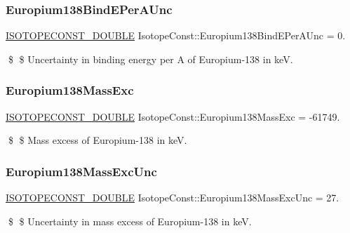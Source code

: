 \subsubsection{\texorpdfstring{Europium138\+Bind\+E\+Per\+A\+Unc}{Europium138BindEPerAUnc}}
{\footnotesize\ttfamily \mbox{\hyperlink{group___isotope_const-_macros_ga8f45a7272ce02c0b4c65c44636ed719a}{I\+S\+O\+T\+O\+P\+E\+C\+O\+N\+S\+T\+\_\+\+D\+O\+U\+B\+LE}} Isotope\+Const\+::\+Europium138\+Bind\+E\+Per\+A\+Unc = 0.}

\$ \$ Uncertainty in binding energy per A of Europium-\/138 in keV. \mbox{\label{group___isotope_const-_europium-_eu138_ga3e7e1759a38e0c6c7fadb81d2b35d40e}} 
\subsubsection{\texorpdfstring{Europium138\+Mass\+Exc}{Europium138MassExc}}
{\footnotesize\ttfamily \mbox{\hyperlink{group___isotope_const-_macros_ga8f45a7272ce02c0b4c65c44636ed719a}{I\+S\+O\+T\+O\+P\+E\+C\+O\+N\+S\+T\+\_\+\+D\+O\+U\+B\+LE}} Isotope\+Const\+::\+Europium138\+Mass\+Exc = -\/61749.}

\$ \$ Mass excess of Europium-\/138 in keV. \mbox{\label{group___isotope_const-_europium-_eu138_gae95368a547299f549a51513acc6f59df}} 
\subsubsection{\texorpdfstring{Europium138\+Mass\+Exc\+Unc}{Europium138MassExcUnc}}
{\footnotesize\ttfamily \mbox{\hyperlink{group___isotope_const-_macros_ga8f45a7272ce02c0b4c65c44636ed719a}{I\+S\+O\+T\+O\+P\+E\+C\+O\+N\+S\+T\+\_\+\+D\+O\+U\+B\+LE}} Isotope\+Const\+::\+Europium138\+Mass\+Exc\+Unc = 27.}

\$ \$ Uncertainty in mass excess of Europium-\/138 in keV. \mbox{\label{group___isotope_const-_europium-_eu138_gaa54f2dc4406bf5a25dff57091204a00f}} 
